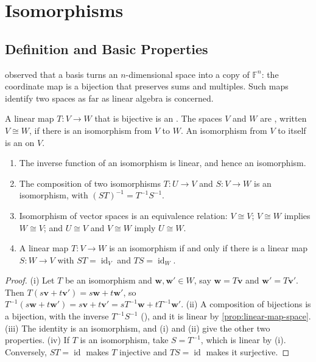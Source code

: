\section{Isomorphisms}
\label{sec:isomorphisms}

\subsection{Definition and Basic Properties}

 observed that a basis turns an $n$-dimensional space into a copy of $\mathbb F^n$: the coordinate map is a bijection that preserves sums and multiples. Such maps identify two spaces as far as linear algebra is concerned.

\begin{definition}[Isomorphism]
\label{def:isomorphism}
A linear map $T\colon V\to W$ that is bijective is an . The spaces $V$ and $W$ are , written $V\cong W$, if there is an isomorphism from $V$ to $W$. An isomorphism from $V$ to itself is an  on $V$.
\end{definition}

\begin{proposition}
\label{prop:isomorphism}
\leavevmode
\begin{enumerate}
\item The inverse function of an isomorphism is linear, and hence an isomorphism.
\item The composition of two isomorphisms $T\colon U\to V$ and $S\colon V\to W$ is an isomorphism, with $(ST)^{-1}=T^{-1}S^{-1}$.
\item Isomorphism of vector spaces is an equivalence relation: $V\cong V$; $V\cong W$ implies $W\cong V$; and $U\cong V$ and $V\cong W$ imply $U\cong W$.
\item A linear map $T\colon V\to W$ is an isomorphism if and only if there is a linear map $S\colon W\to V$ with $ST=\operatorname{id}_V$ and $TS=\operatorname{id}_W$.
\end{enumerate}
\end{proposition}

\begin{proof}
(i) Let $T$ be an isomorphism and $\mathbf w,\mathbf w'\in W$, say $\mathbf w=T\mathbf v$ and $\mathbf w'=T\mathbf v'$. Then $T(s\mathbf v+t\mathbf v')=s\mathbf w+t\mathbf w'$, so $T^{-1}(s\mathbf w+t\mathbf w')=s\mathbf v+t\mathbf v'=sT^{-1}\mathbf w+tT^{-1}\mathbf w'$. (ii) A composition of bijections is a bijection, with the inverse $T^{-1}S^{-1}$ (), and it is linear by \cref{prop:linear-map-space}. (iii) The identity is an isomorphism, and (i) and (ii) give the other two properties. (iv) If $T$ is an isomorphism, take $S=T^{-1}$, which is linear by (i). Conversely, $ST=\operatorname{id}$ makes $T$ injective and $TS=\operatorname{id}$ makes it surjective.
\end{proof}

